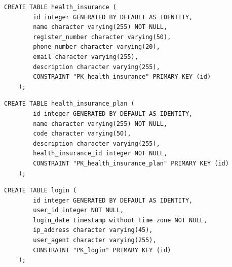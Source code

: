 \begin{quadro}[H]
	\caption[Script SQL --- Tabela \texttt{health\_insurance}]{Script SQL --- Tabela \texttt{health\_insurance}}
	\label{quadro:script-health-insurance}
	
	\begin{minipage}{0.96\textwidth}
		\begin{lstlisting}[style=academic-sql]
	CREATE TABLE health_insurance (
		id integer GENERATED BY DEFAULT AS IDENTITY,
		name character varying(255) NOT NULL,
		register_number character varying(50),
		phone_number character varying(20),
		email character varying(255),
		description character varying(255),
		CONSTRAINT "PK_health_insurance" PRIMARY KEY (id)
	);
		\end{lstlisting}
	\end{minipage}
	
\end{quadro}

\begin{quadro}[H]
	\caption[Script SQL --- Tabela \texttt{health\_insurance\_plan}]{Script SQL --- Tabela \texttt{health\_insurance\_plan}}
	\label{quadro:script-health-insurance-plan}
	
	\begin{minipage}{0.96\textwidth}
		\begin{lstlisting}[style=academic-sql]
	CREATE TABLE health_insurance_plan (
		id integer GENERATED BY DEFAULT AS IDENTITY,
		name character varying(255) NOT NULL,
		code character varying(50),
		description character varying(255),
		health_insurance_id integer NOT NULL,
		CONSTRAINT "PK_health_insurance_plan" PRIMARY KEY (id)
	);
		\end{lstlisting}
	\end{minipage}
	
\end{quadro}

\begin{quadro}[H]
	\caption[Script SQL --- Tabela \texttt{login}]{Script SQL --- Tabela \texttt{login}}
	\label{quadro:script-login}
	
	\begin{minipage}{0.96\textwidth}
		\begin{lstlisting}[style=academic-sql]
	CREATE TABLE login (
		id integer GENERATED BY DEFAULT AS IDENTITY,
		user_id integer NOT NULL,
		login_date timestamp without time zone NOT NULL,
		ip_address character varying(45),
		user_agent character varying(255),
		CONSTRAINT "PK_login" PRIMARY KEY (id)
	);
		\end{lstlisting}
	\end{minipage}
	
\end{quadro}

